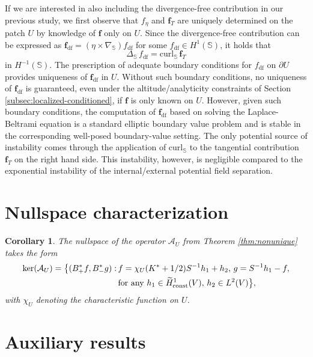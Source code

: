 \documentclass[a4paper, 11pt]{article}
\newtheorem{corollary}[theorem]{Corollary}
\renewcommand{\SS}{\mathbb{S}}
\newcommand{\f}{\mathbf{f}}
\begin{document}
If we are interested in also including the divergence-free contribution in our previous study, we first observe that $f_\eta$ and $\f_T$ are uniquely determined on the patch $U$ by knowledge of $\f$ only on $U$. Since the divergence-free contribution can be expressed as $\f_{\mathrm{df}}=(\eta\times\nabla_\SS)f_{\mathrm{df}}$ for some $f_{\mathrm{df}}\in H^1(\SS)$, it holds that 
\[
\Delta_\SS\,f_{\mathrm{df}}=\mathrm{curl}_\SS\, \f_T
\]
in $H^{-1}(\SS)$. The prescription of adequate boundary conditions for $f_{\mathrm{df}}$ on $\partial U$ provides uniqueness of $\f_{\mathrm{df}}$ in $U$. Without such boundary conditions, no uniqueness of $\f_{\mathrm{df}}$ is guaranteed, even under the altitude/analyticity constraints of Section \ref{subsec:localized-conditioned}, if $\f$ is only known on $U$. However, given such boundary conditions, the computation of $\f_{\mathrm{df}}$ based on solving the Laplace-Beltrami equation is a standard elliptic boundary value problem and is stable in the corresponding well-posed boundary-value setting. The only potential source of instability comes through the application of $\mathrm{curl}_\SS$ to the tangential contribution $\f_T$ on the right hand side. This instability, however, is negligible compared to the exponential instability of the internal/external potential field separation.
 


\section{Nullspace characterization}\label{app:null}

\begin{corollary}\label{cor:nullspace}
    The nullspace of the operator $\mathcal A_U$ from Theorem \ref{thm:nonunique} takes the form
    \begin{align}
    	\ker(\mathcal A_U)=\big\{(B_+^{\ast} f,B_-^{\ast}g):\,&f= \chi_U(K^{\ast}+1/2)S^{-1}h_1+h_2,\, g=S^{-1}h_1-f,\label{eqn:nullspace}
	    	\\&\textnormal{for any }h_1\in \widetilde H^1_{\text{const}}(V),\, h_2\in L^2(V)\big\},\nonumber
	    \end{align} 
	    with $\chi_U$ denoting the characteristic function on $U$. 
\end{corollary}





\section{Auxiliary results}\label{app:aux}
\end{document}
